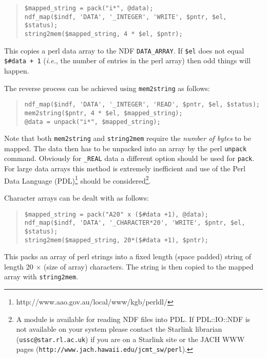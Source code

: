 \documentclass[twoside,11pt]{article}
\newcommand{\htmladdnormallinkfoot}[2]{#1\footnote{#2}}
\newenvironment{myquote}{\begin{quote}\begin{small}}{\end{small}\end{quote}}
\begin{document}
\begin{myquote}
\begin{verbatim}
$mapped_string = pack("i*", @data);
ndf_map($indf, 'DATA', '_INTEGER', 'WRITE', $pntr, $el, $status);
string2mem($mapped_string, 4 * $el, $pntr);
\end{verbatim}
\end{myquote}

This copies a perl data array to the NDF \texttt{DATA\_ARRAY}. If
\texttt{\$el} does not equal \texttt{\$\#data + 1} (\emph{i.e.}, the
number of entries in the perl array) then odd things will happen.

The reverse process can be achieved using \texttt{mem2string} as follows:

\begin{myquote}
\begin{verbatim}
ndf_map($indf, 'DATA', '_INTEGER', 'READ', $pntr, $el, $status);
mem2string($pntr, 4 * $el, $mapped_string);
@data = unpack("i*", $mapped_string);
\end{verbatim}
\end{myquote}

Note that both \texttt{mem2string} and \texttt{string2mem} require the
\emph{number of bytes\/} to be mapped.  The data then has to be
unpacked into an array by the perl \texttt{unpack} command. Obviously
for \texttt{\_REAL} data a different option should be used for
\texttt{pack}.  For large data arrays this method is extremely
inefficient and use of the \htmladdnormallinkfoot{Perl Data Language
(PDL)}{http://www.aao.gov.au/local/www/kgb/perldl/} should be
considered\footnote{A module is available for reading NDF files into
PDL. If PDL::IO::NDF is not available on your system please contact the
Starlink librarian (\texttt{ussc@star.rl.ac.uk}) if you are on a
Starlink site or the JACH WWW pages
(\texttt{http://www.jach.hawaii.edu/jcmt\_sw/perl}).}.


Character arrays can be dealt with as follows:

\begin{myquote}
\begin{verbatim}
$mapped_string = pack("A20" x ($#data +1), @data);
ndf_map($indf, 'DATA', '_CHARACTER*20', 'WRITE', $pntr, $el, $status);
string2mem($mapped_string, 20*($#data +1), $pntr);
\end{verbatim}
\end{myquote}

This packs an array of perl strings into a fixed length (space padded) string
of length 20 $\times$ (size of array) characters. The string is then copied to
the mapped array with \texttt{string2mem}.
\end{document}
